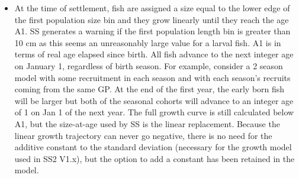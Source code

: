 \begin{itemize}
		\item At the time of settlement, fish are assigned a size equal to the lower edge of the first population size bin and they grow linearly until they reach the age A1. SS generates a warning if the first population length bin is greater than 10 cm as this seems an unreasonably large value for a larval fish.  A1 is in terms of real age elapsed since birth. All fish advance to the next integer age on January 1, regardless of birth season. For example, consider a 2 season model with some recruitment in each season and with each season's recruits coming from the same GP.  At the end of the first year, the early born fish will be larger but both of the seasonal cohorts will advance to an integer age of 1 on Jan 1 of the next year.  The full growth curve is still calculated below A1, but the size-at-age used by SS is the linear replacement. Because the linear growth trajectory can never go negative, there is no need for the additive constant to the standard deviation (necessary for the growth model used in SS2 V1.x), but the option to add a constant has been retained in the model.
	\end{itemize}
	
